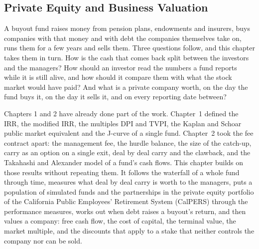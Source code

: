 
\raggedbottom %
\begin{chapterrefs}
\setcounter{chapter}{10}
\chapter{Private Equity and Business Valuation}
\label{ch:pe}

A buyout fund raises money from pension plans, endowments and insurers, buys companies with that money
and with debt the companies themselves take on, runs them for a few years and sells them. Three questions follow,
and this chapter takes them in turn. How is the cash that comes back split between the investors and
the managers? How should an investor read the numbers a fund reports while it is still alive, and how
should it compare them with what the stock market would have paid? And what is a private company worth,
on the day the fund buys it, on the day it sells it, and on every reporting date between?

Chapters 1 and 2 have already done part of the work. Chapter~1 defined the IRR, the modified IRR, the
multiples DPI and TVPI, the Kaplan and Schoar public market equivalent and the J-curve of a single
fund. Chapter~2 took the fee contract apart: the management fee, the hurdle balance, the size of the
catch-up, carry as an option on a single exit, deal by deal carry and the clawback, and the
Takahashi and Alexander model of a fund's cash flows. This chapter builds on those results without
repeating them. It follows the waterfall of a whole fund through time, measures what deal by deal
carry is worth to the managers, puts a population of simulated funds and the \cvFunds{} partnerships in the
private equity portfolio of the California Public Employees' Retirement System (CalPERS) through the
performance measures, works out when debt raises a buyout's return, and then values a company: free
cash flow, the cost of capital, the terminal value, the market multiple, and the discounts that apply
to a stake that neither controls the company nor can be sold.


\end{chapterrefs}
